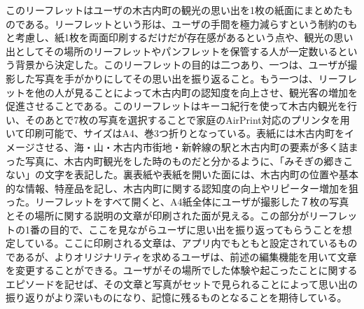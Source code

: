 このリーフレットはユーザの木古内町の観光の思い出を1枚の紙面にまとめたものである。リーフレットという形は、ユーザの手間を極力減らすという制約のもと考慮し、紙1枚を両面印刷するだけだが存在感があるという点や、観光の思い出としてその場所のリーフレットやパンフレットを保管する人が一定数いるという背景から決定した。このリーフレットの目的は二つあり、一つは、ユーザが撮影した写真を手がかりにしてその思い出を振り返ること。もう一つは、リーフレットを他の人が見ることによって木古内町の認知度を向上させ、観光客の増加を促進させることである。このリーフレットはキーコ紀行を使って木古内観光を行い、そのあとで7枚の写真を選択することで家庭のAirPrint対応のプリンタを用いて印刷可能で、サイズはA4、巻3つ折りとなっている。表紙には木古内町をイメージさせる、海・山・木古内市街地・新幹線の駅と木古内町の要素が多く詰まった写真に、木古内町観光をした時のものだと分かるように、「みそぎの郷きこない」の文字を表記した。裏表紙や表紙を開いた面には、木古内町の位置や基本的な情報、特産品を記し、木古内町に関する認知度の向上やリピーター増加を狙った。リーフレットをすべて開くと、A4紙全体にユーザが撮影した７枚の写真とその場所に関する説明の文章が印刷された面が見える。この部分がリーフレットの1番の目的で、ここを見ながらユーザに思い出を振り返ってもらうことを想定している。ここに印刷される文章は、アプリ内でもともと設定されているものであるが、よりオリジナリティを求めるユーザは、前述の編集機能を用いて文章を変更することができる。ユーザがその場所でした体験や起こったことに関するエピソードを記せば、その文章と写真がセットで見られることによって思い出の振り返りがより深いものになり、記憶に残るものとなることを期待している。

